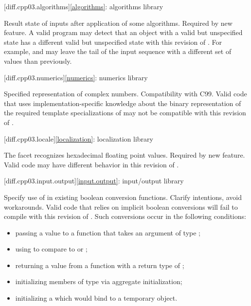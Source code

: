 [diff.cpp03.algorithms]{\ref{algorithms}: algorithms library}

\change
Result state of inputs after application of some algorithms.
\rationale
Required by new feature.
\effect
A valid \CppIII{} program may detect that an object with a valid but
unspecified state has a different valid but unspecified state with this
revision of \Cpp{}. For example,  and
 may leave the tail of the input sequence with a
different set of values than previously.

[diff.cpp03.numerics]{\ref{numerics}: numerics library}

\change
Specified representation of complex numbers.
\rationale
Compatibility with C99.
\effect
Valid \CppIII{} code that uses implementation-specific knowledge about the
binary representation of the required template specializations of
 may not be compatible with this revision of \Cpp{}.

[diff.cpp03.locale]{\ref{localization}: localization library}

\change
The  facet recognizes hexadecimal floating point values.
\rationale
Required by new feature.
\effect
Valid \CppIII{} code may have different behavior in this revision of \Cpp{}.

[diff.cpp03.input.output]{\ref{input.output}: input/output library}

\change
Specify use of  in existing boolean conversion functions.
\rationale
Clarify intentions, avoid workarounds.
\effect
Valid \CppIII{} code that relies on implicit boolean conversions will fail to
compile with this revision of \Cpp{}. Such conversions occur in the
following conditions:

\begin{itemize}
\item passing a value to a function that takes an argument of type ;
\item using  to compare to  or ;
\item returning a value from a function with a return type of ;
\item initializing members of type  via aggregate initialization;
\item initializing a  which would bind to a temporary object.
\end{itemize}

